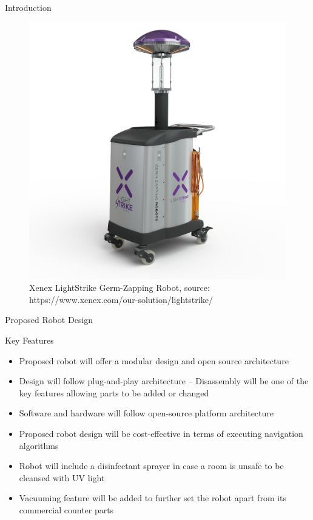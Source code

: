 \documentclass{beamer}
\begin{document}
\begin{frame}{Introduction}{}
\begin{figure}
	\centering
	\includegraphics[scale=0.15]{figs/img/xenexLightstrike}
	\caption{Xenex LightStrike Germ-Zapping Robot, source: https://www.xenex.com/our-solution/lightstrike/}
\end{figure}
\end{frame}

\begin{frame}{Proposed Robot Design}
  \begin{exampleblock}{Key Features}
    \begin{itemize}
    \item Proposed robot will offer a modular design and open source architecture
    \item Design will follow plug-and-play architecture -- Disassembly will be one of the key features allowing parts to be added or changed
    \item Software and hardware will follow open-source platform architecture 
      
    \item Proposed robot design will be cost-effective in terms of executing
      navigation algorithms  
    \end{itemize}
  \end{exampleblock}
  \pause
  \begin{exampleblock}{}
    \begin{itemize}
    \item Robot will include a disinfectant sprayer in case a room is unsafe to be cleansed with UV light
    \item Vacuuming feature will be added to further set the robot apart from its commercial counter parts
    \end{itemize}
  \end{exampleblock}
\end{frame}
\end{document}
